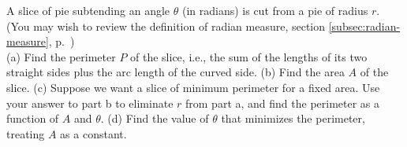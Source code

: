 A slice of pie subtending an angle $\theta$ (in radians) is cut from
a pie of radius $r$. (You may wish to review the definition of radian
measure, section \ref{subsec:radian-measure}, p.~\pageref{subsec:radian-measure})\\
(a) Find the perimeter $P$ of the slice, i.e., the sum of
the lengths of its two straight sides plus the arc
length of the curved side.\answercheck\hwendpart
(b) Find the area $A$ of the slice.\answercheck\hwendpart
(c) Suppose we want a slice of minimum perimeter for a fixed area.
Use your answer to part b to eliminate $r$ from part a, and
find the perimeter as a function of $A$ and $\theta$.\answercheck\hwendpart
(d) Find the value of $\theta$ that minimizes the perimeter, treating $A$ as a constant.\answercheck\hwendpart
